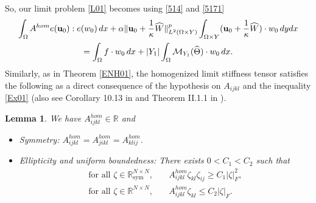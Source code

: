 \documentclass[11pt,a4paper]{article}
\numberwithin{equation}{section}
\def\O{\Omega}
\def\sy{\text{sym}}
\def\a{{\alpha}}
\def\R{{\mathbb{R}}}
\def\R{{\mathbb{R}}}
\def\Mc{{\mathcal{M}}}
\def\wh{\widehat }
\def\X{\times }
\def\Gu{{\bf u}}
\newtheorem{lemma}[theorem]{Lemma}
\begin{document}
So, our limit problem \eqref{L01} becomes using \eqref{514} and \eqref{5171}
\begin{multline*}
	\int_{\O}A^{hom}e(\Gu_0):e(w_0)\,dx+\a\|\Gu_0+{1\over \kappa}\wh W\|^p_{L^2(\O\X Y)}\int_{\O\X Y}(\Gu_0+{1\over \kappa}\wh W)\cdot w_0\,dydx\\
	=\int_{\O}f\cdot w_0\,dx+|Y_1|\int_\O\Mc_{Y_1}(\wh\Theta)\cdot w_0\,dx.
\end{multline*}
Similarly, as in Theorem \ref{ENH01}, the homogenized limit stiffness tensor satisfies the following as a direct consequence of the hypothesis on $A_{ijkl}$ and the inequality \eqref{Ex01} (also see  Corollary 10.13 in \cite{Donato} and Theorem II.1.1 in \cite{Olenik}).
\begin{lemma}\label{HT01}
	We have $A^{hom}_{ijkl}\in\R$ and
	\begin{itemize}
		\item Symmetry: $A^{hom}_{ijkl}=A^{hom}_{jikl}=A^{hom}_{klij}$.
		\item Ellipticity and uniform boundedness: There exists  $0<C_1<C_2$ such that
		\begin{equation}\label{424}
			\begin{aligned}
				\text{for all $\zeta\in \R^{N\X N}_\sy$},&\quad A_{ijkl}^{hom}\zeta_{kl}\zeta_{ij}\geq C_1|\zeta|^2_F,\\
				\text{for all $\zeta\in \R^{N\X N}$},&\quad A_{ijkl}^{hom}\zeta_{kl}\leq C_2|\zeta|_F. 
			\end{aligned}
		\end{equation}
	\end{itemize}
\end{lemma}
%
\end{document}
